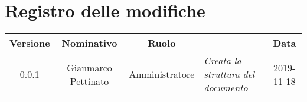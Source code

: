 \section*{Registro delle modifiche}
\renewcommand{\arraystretch}{1.8}
  
  \begin{longtable}{|c|c|c|p{3.8cm}|c|}
    \hline
    
    \rowcolor{header}
    \textbf{Versione} & \textbf{Nominativo} & \textbf{Ruolo} & \centering{\textbf{Descrizione}} & \textbf{Data}\\
    
    \hline
    
    0.0.1 & Gianmarco Pettinato & Amministratore & \small{\textit{Creata la struttura del documento}} & 2019-11-18\\
    
    \hline
  \end{longtable}
